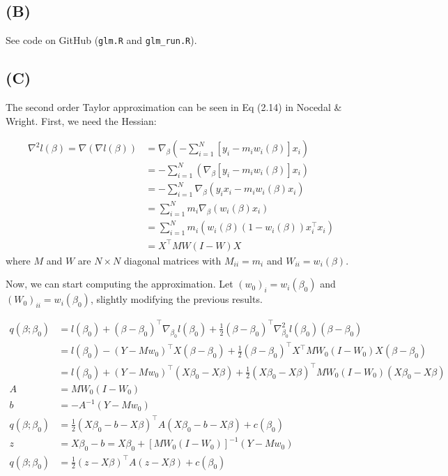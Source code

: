 \documentclass{article}
\begin{document}
\subsection{(B)}
See code on GitHub (\texttt{glm.R} and \texttt{glm\_run.R}).

\subsection{(C)}
The second order Taylor approximation can be seen in Eq (2.14) in Nocedal \& Wright. First, we need the Hessian:

\begin{align*}
\nabla^2 l(\beta)=\nabla (\nabla l(\beta))&=\nabla_\beta\left(-\sum_{i=1}^N \left[y_i- m_iw_i(\beta)\right]x_i\right)\\
&=-\sum_{i=1}^N\left(\nabla_\beta\left[y_i- m_iw_i(\beta)\right]x_i\right)\\
&=-\sum_{i=1}^N\nabla_\beta\left(y_ix_i- m_iw_i(\beta)x_i\right)\\
&=\sum_{i=1}^Nm_i\nabla_\beta\left(w_i(\beta)x_i\right)\\
&=\sum_{i=1}^Nm_i\left(w_i(\beta)(1-w_i(\beta))x_i^\top x_i\right)\\
&=X^\top M W (I-W) X
\end{align*}
where $M$ and $W$ are $N\times N$ diagonal matrices with $M_{ii}=m_i$ and $W_{ii}=w_i(\beta)$.

Now, we can start computing the approximation. Let $\left(w_0\right)_i = w_i(\beta_0)$ and $\left(W_0\right)_{ii}=w_i(\beta_0)$, slightly modifying the previous results.

\begin{align*}
q(\beta; \beta_0)&= l(\beta_0) + (\beta-\beta_0)^\top \nabla_{\beta_0} l(\beta_0) + \frac{1}{2}(\beta-\beta_0)^\top \nabla_{\beta_0}^2 l(\beta_0) (\beta-\beta_0)\\
&=l(\beta_0) -  (Y - Mw_0)^\top X(\beta-\beta_0)+ \frac{1}{2}(\beta-\beta_0)^\top X^\top M W_0 (I-W_0) X (\beta-\beta_0)\\
&=l(\beta_0) +  (Y - Mw_0)^\top (X\beta_0-X\beta)+ \frac{1}{2}(X\beta_0-X\beta)^\top  M W_0 (I-W_0) (X\beta_0-X\beta)\\
A&=M W_0 (I-W_0)\\
b&=-A^{-1}(Y - Mw_0)\\
q(\beta; \beta_0)&=\frac{1}{2}(X\beta_0-b-X\beta)^\top A (X\beta_0-b-X\beta) + c(\beta_0)\\
z&=X\beta_0-b=X\beta_0+\left[M W_0 (I-W_0)\right]^{-1}(Y - Mw_0)\\
q(\beta; \beta_0)&=\frac{1}{2}(z-X\beta)^\top A (z-X\beta) + c(\beta_0)\\
\end{align*}
\end{document}
